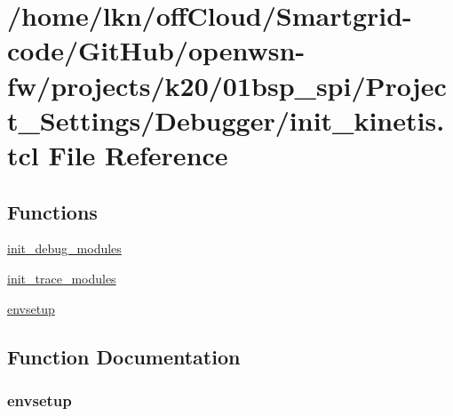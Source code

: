 \hypertarget{01bsp__spi_2_project___settings_2_debugger_2init__kinetis_8tcl}{}\section{/home/lkn/off\+Cloud/\+Smartgrid-\/code/\+Git\+Hub/openwsn-\/fw/projects/k20/01bsp\+\_\+spi/\+Project\+\_\+\+Settings/\+Debugger/init\+\_\+kinetis.tcl File Reference}
\label{01bsp__spi_2_project___settings_2_debugger_2init__kinetis_8tcl}
\subsection*{Functions}
\begin{DoxyCompactItemize}
\item 
\hyperlink{01bsp__spi_2_project___settings_2_debugger_2init__kinetis_8tcl_a10c80471835dee84e7652764cecbb722}{init\+\_\+debug\+\_\+modules}
\item 
\hyperlink{01bsp__spi_2_project___settings_2_debugger_2init__kinetis_8tcl_a8ecf61d10da6f21c5b31426f9a235e03}{init\+\_\+trace\+\_\+modules}
\item 
\hyperlink{01bsp__spi_2_project___settings_2_debugger_2init__kinetis_8tcl_a7f6b4cebda44b6e9d42cc7879ee95e8e}{envsetup}
\end{DoxyCompactItemize}


\subsection{Function Documentation}
\subsubsection[{\texorpdfstring{envsetup}{envsetup}}]{\setlength{\rightskip}{0pt plus 5cm}envsetup}\hypertarget{01bsp__spi_2_project___settings_2_debugger_2init__kinetis_8tcl_a7f6b4cebda44b6e9d42cc7879ee95e8e}{}\label{01bsp__spi_2_project___settings_2_debugger_2init__kinetis_8tcl_a7f6b4cebda44b6e9d42cc7879ee95e8e}


